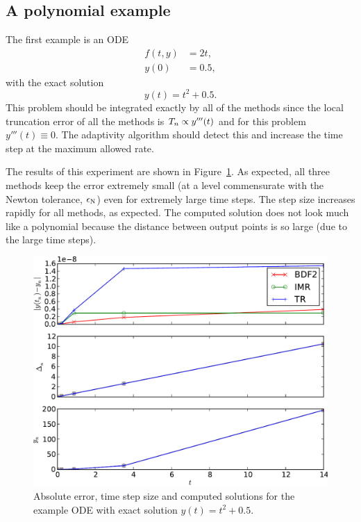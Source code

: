 \subsection{A polynomial example}
\label{sec:imr-polynomial-example}

The first example is an ODE
\begin{equation}
  \begin{aligned}
    f(t,y) &= 2t, \\
    y(0) &= 0.5,
  \end{aligned}
\end{equation}
with the exact solution
\begin{equation}
  y(t) = t^2 + 0.5.
\end{equation}
This problem should be integrated exactly by all of the methods since the local truncation error of all the methods is $T_n \propto y'''(t)$ and for this problem $y'''(t) \equiv 0$.
The adaptivity algorithm should detect this and increase the time step at the maximum allowed rate.

The results of this experiment are shown in Figure~\ref{fig:imr-poly2-example}.
As expected, all three methods keep the error extremely small (at a level commensurate with the Newton tolerance, $\epsilon_{\mathrm{N}}$) even for extremely large time steps.
The step size increases rapidly for all methods, as expected.
The computed solution does not look much like a polynomial because the distance between output points is so large (due to the large time steps).

\begin{figure}
  \centering
  \includegraphics[width=1\textwidth]{plots/aimr_odes_traces/poly2-errornormsvs-dtsvs-tracevaluesvstimes}
  \caption{Absolute error, time step size and computed solutions for the example ODE with exact solution $y(t) = t^2 + 0.5$.}
  \label{fig:imr-poly2-example}
\end{figure}


